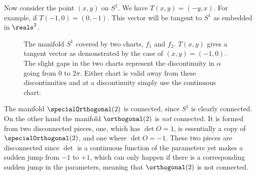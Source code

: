 Now consider the point \((x, y)\) on \(S^1\).
We have \(T(x, y) = (-y, x)\).
For example, if \(T(-1, 0) = (0, -1)\).
This vector will be tangent to \(S^1\) as embedded in \(\reals^2\).

\begin{figure}
    \caption[The manifold \(S^1\)]{The manifold \(S^1\) covered by two charts, \(f_1\) and \(f_2\). \(T(x, y)\) gives a tangent vector as demonstrated by the case of \((x, y) = (-1, 0)\). The slight gaps in the two charts represent the discontinuity in \(\alpha\) going from 0 to \(2\pi\). Either chart is valid away from these discontinuities and at a discontinuity simply use the continuous chart.}
\end{figure}

The manifold \(\specialOrthogonal(2)\) is connected, since \(S^1\) is clearly connected.
On the other hand the manifold \(\orthogonal(2)\) is \emph{not} connected.
It is formed from two disconnected pieces, one, which has \(\det O = 1\), is essentially a copy of \(\specialOrthogonal(2)\), and one where \(\det O = -1\).
These two pieces are disconnected since \(\det\) is a continuous function of the parameters yet makes a sudden jump from \(-1\) to \(+1\), which can only happen if there is a corresponding sudden jump in the parameters, meaning that \(\orthogonal(2)\) is not connected.

